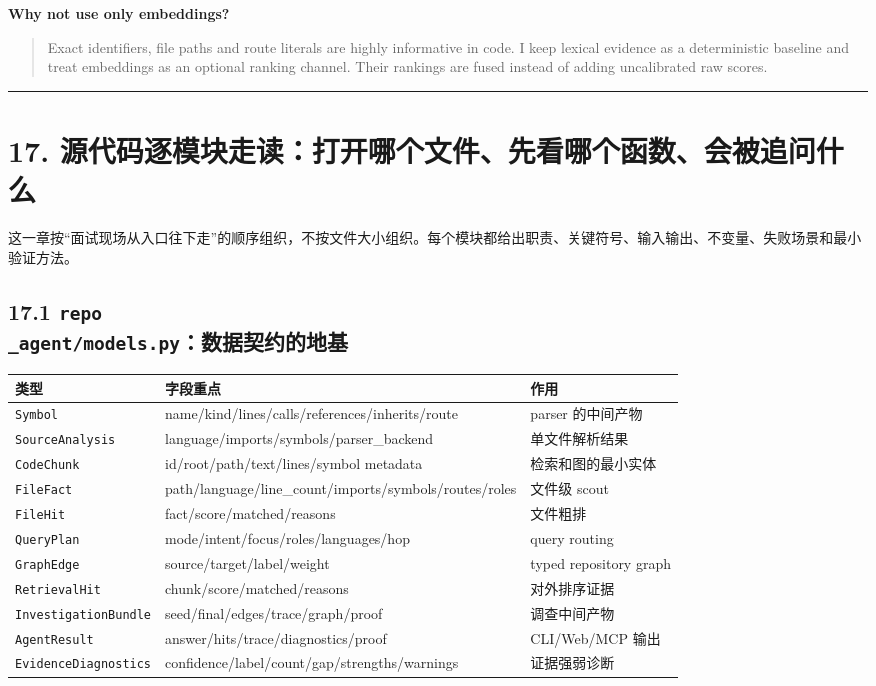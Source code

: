 \documentclass[UTF8,12pt,openany]{ctexbook}
\begin{document}
\textbf{Why not use only embeddings?}\par

\begin{quote}
Exact identifiers, file paths and route literals are highly informative in code. I keep lexical evidence as a deterministic baseline and treat embeddings as an optional ranking channel. Their rankings are fused instead of adding uncalibrated raw scores.
\end{quote}

\hrule

\section{17. 源代码逐模块走读：打开哪个文件、先看哪个函数、会被追问什么}

这一章按“面试现场从入口往下走”的顺序组织，不按文件大小组织。每个模块都给出职责、关键符号、输入输出、不变量、失败场景和最小验证方法。\par

\subsection{17.1 \texttt{repo\\_agent/models.py}：数据契约的地基}

\begin{center}
\small
\begin{longtable}{|p{}|p{}|p{}|}
\toprule
类型 & 字段重点 & 作用 \\
\midrule
\texttt{Symbol} & name/kind/lines/calls/references/inherits/route & parser 的中间产物 \\
\texttt{SourceAnalysis} & language/imports/symbols/parser\_backend & 单文件解析结果 \\
\texttt{CodeChunk} & id/root/path/text/lines/symbol metadata & 检索和图的最小实体 \\
\texttt{FileFact} & path/language/line\_count/imports/symbols/routes/roles & 文件级 scout \\
\texttt{FileHit} & fact/score/matched/reasons & 文件粗排 \\
\texttt{QueryPlan} & mode/intent/focus/roles/languages/hop & query routing \\
\texttt{GraphEdge} & source/target/label/weight & typed repository graph \\
\texttt{RetrievalHit} & chunk/score/matched/reasons & 对外排序证据 \\
\texttt{InvestigationBundle} & seed/final/edges/trace/graph/proof & 调查中间产物 \\
\texttt{AgentResult} & answer/hits/trace/diagnostics/proof & CLI/Web/MCP 输出 \\
\texttt{EvidenceDiagnostics} & confidence/label/count/gap/strengths/warnings & 证据强弱诊断 \\
\bottomrule
\end{longtable}
\end{center}
\end{document}
